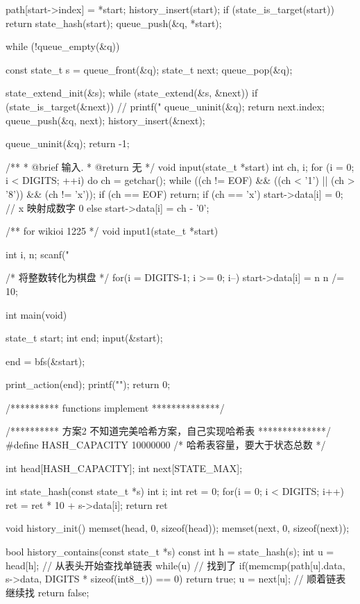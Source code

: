 \begin{Codex}[label=eight_digits_bfs2.c]
{    path[start->index] = *start;
    history_insert(start);
    if (state_is_target(start))
        return state_hash(start);
    queue_push(&q, *start);

    while (!queue_empty(&q)) {
        const state_t s = queue_front(&q);
        state_t next;
        queue_pop(&q);

        state_extend_init(&s);
        while (state_extend(&s, &next)) {
            if (state_is_target(&next)) {
                // printf("%
                queue_uninit(&q);
                return next.index;
            }
            queue_push(&q, next);
            history_insert(&next);
        }
    }
    queue_uninit(&q);
    return -1;
}

/**
 * @brief 输入.
 * @return 无
 */
void input(state_t *start) {
    int ch, i;
    for (i = 0; i < DIGITS; ++i) {
        do {
            ch = getchar();
        } while ((ch != EOF) && ((ch < '1') || (ch > '8')) && (ch != 'x'));
        if (ch == EOF) return;
        if (ch == 'x') start->data[i] = 0; // x 映射成数字 0
        else           start->data[i] = ch - '0';
    }
}

/** for wikioi 1225 */
void input1(state_t *start) {
    int i, n;
    scanf("%

    /* 将整数转化为棋盘 */
    for(i = DIGITS-1; i >= 0; i--) {
        start->data[i] = n %
        n /= 10;
    }
}

int main(void) {
    state_t start;
    int end;
    input(&start);

    end = bfs(&start);

    print_action(end);
    printf("\n");
    return 0;
}

/********** functions implement **************/

/********** 方案2 不知道完美哈希方案，自己实现哈希表 **************/
#define HASH_CAPACITY  10000000  /* 哈希表容量，要大于状态总数 */

int head[HASH_CAPACITY];
int next[STATE_MAX];

int state_hash(const state_t *s) {
    int i;
    int ret = 0;
    for(i = 0; i < DIGITS; i++) ret = ret * 10 + s->data[i];
    return ret %
}

void history_init() {
    memset(head, 0, sizeof(head));
    memset(next, 0, sizeof(next));
}

bool history_contains(const state_t *s) {
    const int h = state_hash(s);
    int u = head[h]; // 从表头开始查找单链表
    while(u) {
        // 找到了
        if(memcmp(path[u].data, s->data,
                DIGITS * sizeof(int8_t)) == 0) return true;
        u = next[u]; // 顺着链表继续找
    }
    return false;
}


\end{Codex}
